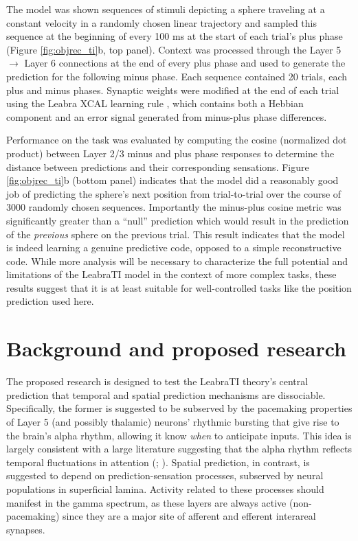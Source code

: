 \documentclass[defaultstyle,12pt]{thesis}
\begin{document}
{The model was shown sequences of stimuli depicting a sphere traveling at a constant velocity in a randomly chosen linear trajectory and sampled this sequence at the beginning of every 100 ms at the start of each trial's plus phase (Figure \ref{fig:objrec_ti}b, top panel). Context was processed through the Layer 5 $\rightarrow$ Layer 6 connections at the end of every plus phase and used to generate the prediction for the following minus phase. Each sequence contained 20 trials, each plus and minus phases. Synaptic weights were modified at the end of each trial using the Leabra XCAL learning rule \cite{OReillyMunakataFrankEtAl12}, which contains both a Hebbian component and an error signal generated from minus-plus phase differences.

Performance on the task was evaluated by computing the cosine (normalized dot product) between Layer 2/3 minus and plus phase responses to determine the distance between predictions and their corresponding sensations. Figure \ref{fig:objrec_ti}b (bottom panel) indicates that the model did a reasonably good job of predicting the sphere's next position from trial-to-trial over the course of 3000 randomly chosen sequences. Importantly the minus-plus cosine metric was significantly greater than a ``null'' prediction which would result in the prediction of the \textit{previous} sphere on the previous trial. This result indicates that the model is indeed learning a genuine predictive code, opposed to a simple reconstructive code. While more analysis will be necessary to characterize the full potential and limitations of the LeabraTI model in the context of more complex tasks, these results suggest that it is at least suitable for well-controlled tasks like the position prediction used here.

\chapter{Background and proposed research}
\label{chap:experiments}

The proposed research is designed to test the LeabraTI theory's central prediction that temporal and spatial prediction mechanisms are dissociable. Specifically, the former is suggested to be subserved by the pacemaking  properties of Layer 5 (and possibly thalamic) neurons' rhythmic bursting that give rise to the brain's alpha rhythm, allowing it know \textit{when} to anticipate inputs. This idea is largely consistent with a large literature suggesting that the alpha rhythm reflects temporal fluctuations in attention (; ). Spatial prediction, in contrast, is suggested to depend on prediction-sensation processes, subserved by neural populations in superficial lamina. Activity related to these processes should manifest in the gamma spectrum, as these layers are always active (non-pacemaking) since they are a major site of afferent and efferent interareal synapses.

}
\end{document}
